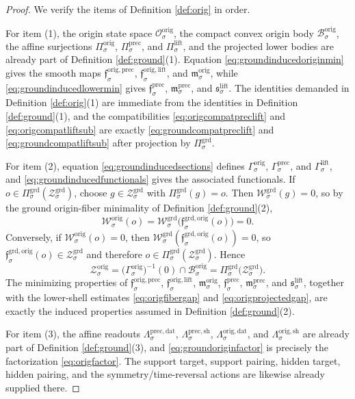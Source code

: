 \documentclass[11pt]{article}
\newcommand{\LiftProj}[1]{\Pi_{#1}^{\mathrm{lift}}}
\newcommand{\LiftSelect}[1]{\mathfrak s_{#1}^{\mathrm{lift}}}
\newcommand{\LiftSection}[1]{\Gamma_{#1}^{\mathrm{lift}}}
\newcommand{\PrecProj}[1]{\Pi_{#1}^{\mathrm{prec}}}
\newcommand{\PrecLiftMin}[1]{\mathfrak f_{#1}^{\mathrm{prec}}}
\newcommand{\PrecSubMin}[1]{\mathfrak m_{#1}^{\mathrm{prec}}}
\newcommand{\PrecSection}[1]{\Gamma_{#1}^{\mathrm{prec}}}
\newcommand{\PrecData}[1]{\Lambda_{#1}^{\mathrm{prec,dat}}}
\newcommand{\PrecShellMap}[1]{\Lambda_{#1}^{\mathrm{prec,sh}}}
\newcommand{\OrigSpace}[1]{\mathcal O_{#1}^{\mathrm{orig}}}
\newcommand{\OrigBody}[1]{\mathcal B_{#1}^{\mathrm{orig}}}
\newcommand{\OrigProj}[1]{\Pi_{#1}^{\mathrm{orig}}}
\newcommand{\OrigPrecMin}[1]{\mathfrak f_{#1}^{\mathrm{orig,prec}}}
\newcommand{\OrigLiftMin}[1]{\mathfrak f_{#1}^{\mathrm{orig,lift}}}
\newcommand{\OrigSubMin}[1]{\mathfrak m_{#1}^{\mathrm{orig}}}
\newcommand{\OrigSection}[1]{\Gamma_{#1}^{\mathrm{orig}}}
\newcommand{\OrigFunctional}[1]{\mathscr W_{#1}^{\mathrm{orig}}}
\newcommand{\OrigData}[1]{\Lambda_{#1}^{\mathrm{orig,dat}}}
\newcommand{\OrigShellMap}[1]{\Lambda_{#1}^{\mathrm{orig,sh}}}
\newcommand{\OrigShellSet}[1]{\mathcal Z_{#1}^{\mathrm{orig}}}
\newcommand{\GroundProj}[1]{\Pi_{#1}^{\mathrm{grd}}}
\newcommand{\GroundOrigMin}[1]{\mathfrak f_{#1}^{\mathrm{grd,orig}}}
\newcommand{\GroundFunctional}[1]{\mathscr W_{#1}^{\mathrm{grd}}}
\newcommand{\GroundShellSet}[1]{\mathcal Z_{#1}^{\mathrm{grd}}}
\begin{document}
\begin{proof}
We verify the items of Definition \ref{def:orig} in order.

For item (1), the origin state space \(\OrigSpace{\sigma}\), the compact convex origin body \(\OrigBody{\sigma}\), the affine surjections \(\OrigProj{\sigma}\), \(\PrecProj{\sigma}\), and \(\LiftProj{\sigma}\), and the projected lower bodies are already part of Definition \ref{def:ground}(1). Equation \eqref{eq:groundinducedoriginmin} gives the smooth maps \(\OrigPrecMin{\sigma}\), \(\OrigLiftMin{\sigma}\), and \(\OrigSubMin{\sigma}\), while \eqref{eq:groundinducedlowermin} gives \(\PrecLiftMin{\sigma}\), \(\PrecSubMin{\sigma}\), and \(\LiftSelect{\sigma}\). The identities demanded in Definition \ref{def:orig}(1) are immediate from the identities in Definition \ref{def:ground}(1), and the compatibilities \eqref{eq:origcompatpreclift} and \eqref{eq:origcompatliftsub} are exactly \eqref{eq:groundcompatpreclift} and \eqref{eq:groundcompatliftsub} after projection by \(\GroundProj{\sigma}\).

For item (2), equation \eqref{eq:groundinducedsections} defines \(\OrigSection{\sigma}\), \(\PrecSection{\sigma}\), and \(\LiftSection{\sigma}\), and \eqref{eq:groundinducedfunctionals} gives the associated functionals. If \(o\in\GroundProj{\sigma}(\GroundShellSet{\sigma})\), choose \(g\in\GroundShellSet{\sigma}\) with \(\GroundProj{\sigma}(g)=o\). Then \(\GroundFunctional{\sigma}(g)=0\), so by the ground origin-fiber minimality of Definition \ref{def:ground}(2),
\[
\OrigFunctional{\sigma}(o)
=
\GroundFunctional{\sigma}\bigl(\GroundOrigMin{\sigma}(o)\bigr)
=
0.
\]
Conversely, if \(\OrigFunctional{\sigma}(o)=0\), then \(\GroundFunctional{\sigma}(\GroundOrigMin{\sigma}(o))=0\), so \(\GroundOrigMin{\sigma}(o)\in\GroundShellSet{\sigma}\) and therefore \(o\in\GroundProj{\sigma}(\GroundShellSet{\sigma})\). Hence
\[
\OrigShellSet{\sigma}
=
\bigl(\OrigSection{\sigma}\bigr)^{-1}(0)\cap\OrigBody{\sigma}
=
\GroundProj{\sigma}\bigl(\GroundShellSet{\sigma}\bigr).
\]
The minimizing properties of \(\OrigPrecMin{\sigma}\), \(\OrigLiftMin{\sigma}\), \(\OrigSubMin{\sigma}\), \(\PrecLiftMin{\sigma}\), \(\PrecSubMin{\sigma}\), and \(\LiftSelect{\sigma}\), together with the lower-shell estimates \eqref{eq:origfibergap} and \eqref{eq:origprojectedgap}, are exactly the induced properties assumed in Definition \ref{def:ground}(2).

For item (3), the affine readouts \(\PrecData{\sigma}\), \(\PrecShellMap{\sigma}\), \(\OrigData{\sigma}\), and \(\OrigShellMap{\sigma}\) are already part of Definition \ref{def:ground}(3), and \eqref{eq:groundoriginfactor} is precisely the factorization \eqref{eq:origfactor}. The support target, support pairing, hidden target, hidden pairing, and the symmetry/time-reversal actions are likewise already supplied there.


\end{proof}
\end{document}
